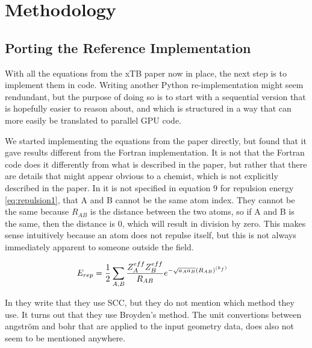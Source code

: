 \chapter{Methodology}\label{sec:meth}

\section{Porting the Reference Implementation}

With all the equations from the xTB paper now in place, the next step is to implement them in code. Writing another Python re-implementation might seem rendundant, but the purpose of doing so is to start with a sequential version that is hopefully easier to reason about, and which is structured in a way that can more easily be translated to parallel GPU code.

We started implementing the equations from the paper directly, but found that it gave results different from the Fortran implementation. It is not that the Fortran code does it differently from what is described in the paper, but rather that there are details that might appear obvious to a chemist, which is not explicitly described in the paper. In \cite{bannwarth2019} it is not specified in equation $9$ for repulsion energy \eqref{eq:repulsion1}, that A and B cannot be the same atom index. They cannot be the same because $R_{AB}$ is the distance between the two atoms, so if A and B is the same, then the distance is $0$, which will result in division by zero. This makes sense intuitively because an atom does not repulse itself, but this is not always immediately apparent to someone outside the field.

\begin{align}
  \E{rep} &= \frac{1}{2}\sum_{A,B}\frac{Z^{eff}_A Z^{eff}_B}{R_{AB}}e^{-\sqrt{a_Aa_B}(R_{AB})^{(k_f)}} \label{eq:repulsion1}
\end{align}



In \cite{grimme2017} they write that they use SCC, but they do not mention which method they use. It turns out that they use Broyden's method. The unit convertions between angström and bohr that are applied to the input geometry data, does also not seem to be mentioned anywhere.

